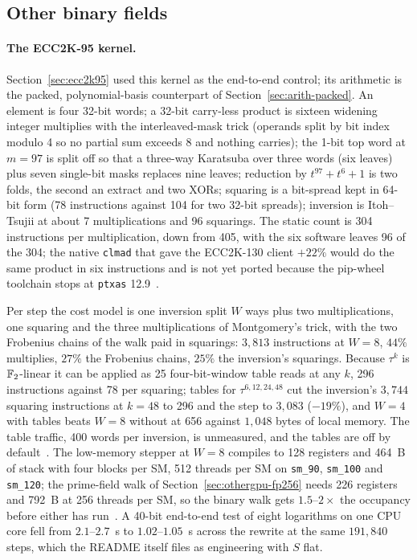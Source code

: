 \subsection{Other binary fields}
\label{sec:othergpu-binary}

\paragraph{The ECC2K-95 kernel.} Section~\ref{sec:ecc2k95} used this
kernel as the end-to-end control; its arithmetic is the packed,
polynomial-basis counterpart of Section~\ref{sec:arith-packed}. An
element is four 32-bit words; a 32-bit carry-less product is sixteen
widening integer multiplies with the interleaved-mask trick (operands
split by bit index modulo 4 so no partial sum exceeds 8 and nothing
carries); the 1-bit top word at $m=97$ is split off so that a
three-way Karatsuba over three words (six leaves) plus seven
single-bit masks replaces nine leaves; reduction by $t^{97}+t^6+1$ is
two folds, the second an extract and two XORs; squaring is a
bit-spread kept in 64-bit form (78 instructions against 104 for two
32-bit spreads); inversion is Itoh--Tsujii at about 7 multiplications
and 96 squarings. The static count is 304 instructions per
multiplication, down from 405, with the six software leaves 96 of the
304; the native \texttt{clmad} that gave the ECC2K-130 client $+22\%$
would do the same product in six instructions and is not yet ported
because the pip-wheel toolchain stops at \texttt{ptxas}
12.9~.

Per step the cost model is one inversion split $W$ ways plus two
multiplications, one squaring and the three multiplications of
Montgomery's trick, with the two Frobenius chains of the walk paid in
squarings: $3{,}813$ instructions at $W=8$, $44\%$ multiplies, $27\%$
the Frobenius chains, $25\%$ the inversion's squarings. Because
$\tau^k$ is $\mathbb{F}_2$-linear it can be applied as 25 four-bit-window
table reads at any $k$, 296 instructions against 78 per squaring;
tables for $\tau^{6,12,24,48}$ cut the inversion's $3{,}744$
squaring instructions at $k=48$ to 296 and the step to $3{,}083$
($-19\%$), and $W=4$ with tables beats $W=8$ without at 656 against
$1{,}048$ bytes of local memory. The table traffic, 400 words per
inversion, is unmeasured, and the tables are off by
default~.
The low-memory stepper at $W=8$ compiles to 128 registers and 464~B
of stack with four blocks per SM, 512 threads per SM on
\texttt{sm\_90}, \texttt{sm\_100} and \texttt{sm\_120}; the
prime-field walk of Section~\ref{sec:othergpu-fp256} needs 226
registers and 792~B at 256 threads per SM, so the binary walk gets
$1.5$--$2\times$ the occupancy before either has run~.
A 40-bit end-to-end test of eight logarithms on one CPU core fell
from $2.1$--$2.7$~s to $1.02$--$1.05$~s across the rewrite at the same
$191{,}840$ steps, which the README itself files as engineering with
$S$ flat.

